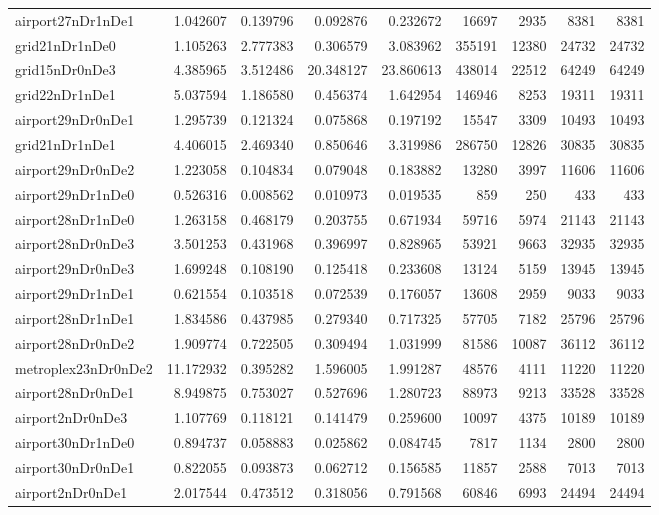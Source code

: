 \begin{longtable}{|l|r|r|r|r|r|r|r|r|}
airport27nDr1nDe1 & 1.042607 & 0.139796 & 0.092876 & 0.232672 & 16697 & 2935 & 8381 & 8381 \\
grid21nDr1nDe0 & 1.105263 & 2.777383 & 0.306579 & 3.083962 & 355191 & 12380 & 24732 & 24732 \\
grid15nDr0nDe3 & 4.385965 & 3.512486 & 20.348127 & 23.860613 & 438014 & 22512 & 64249 & 64249 \\
grid22nDr1nDe1 & 5.037594 & 1.186580 & 0.456374 & 1.642954 & 146946 & 8253 & 19311 & 19311 \\
airport29nDr0nDe1 & 1.295739 & 0.121324 & 0.075868 & 0.197192 & 15547 & 3309 & 10493 & 10493 \\
grid21nDr1nDe1 & 4.406015 & 2.469340 & 0.850646 & 3.319986 & 286750 & 12826 & 30835 & 30835 \\
airport29nDr0nDe2 & 1.223058 & 0.104834 & 0.079048 & 0.183882 & 13280 & 3997 & 11606 & 11606 \\
airport29nDr1nDe0 & 0.526316 & 0.008562 & 0.010973 & 0.019535 & 859 & 250 & 433 & 433 \\
airport28nDr1nDe0 & 1.263158 & 0.468179 & 0.203755 & 0.671934 & 59716 & 5974 & 21143 & 21143 \\
airport28nDr0nDe3 & 3.501253 & 0.431968 & 0.396997 & 0.828965 & 53921 & 9663 & 32935 & 32935 \\
airport29nDr0nDe3 & 1.699248 & 0.108190 & 0.125418 & 0.233608 & 13124 & 5159 & 13945 & 13945 \\
airport29nDr1nDe1 & 0.621554 & 0.103518 & 0.072539 & 0.176057 & 13608 & 2959 & 9033 & 9033 \\
airport28nDr1nDe1 & 1.834586 & 0.437985 & 0.279340 & 0.717325 & 57705 & 7182 & 25796 & 25796 \\
airport28nDr0nDe2 & 1.909774 & 0.722505 & 0.309494 & 1.031999 & 81586 & 10087 & 36112 & 36112 \\
metroplex23nDr0nDe2 & 11.172932 & 0.395282 & 1.596005 & 1.991287 & 48576 & 4111 & 11220 & 11220 \\
airport28nDr0nDe1 & 8.949875 & 0.753027 & 0.527696 & 1.280723 & 88973 & 9213 & 33528 & 33528 \\
airport2nDr0nDe3 & 1.107769 & 0.118121 & 0.141479 & 0.259600 & 10097 & 4375 & 10189 & 10189 \\
airport30nDr1nDe0 & 0.894737 & 0.058883 & 0.025862 & 0.084745 & 7817 & 1134 & 2800 & 2800 \\
airport30nDr0nDe1 & 0.822055 & 0.093873 & 0.062712 & 0.156585 & 11857 & 2588 & 7013 & 7013 \\
airport2nDr0nDe1 & 2.017544 & 0.473512 & 0.318056 & 0.791568 & 60846 & 6993 & 24494 & 24494 \\

\end{longtable}
